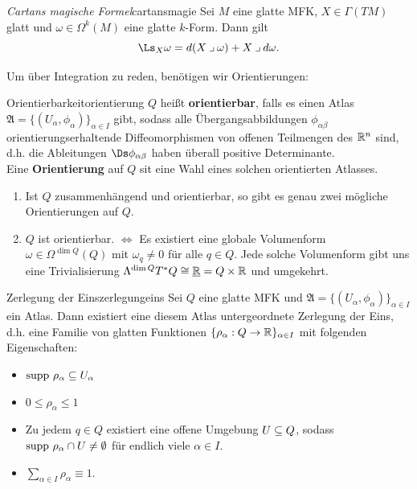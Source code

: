 \begin{theorem}{\textit{Cartans magische Formel}}{cartansmagie}
Sei $M$ eine glatte MFK, $X \in \Gamma(TM)$ glatt und $\omega \in \Omega^k(M)$ eine glatte $k$-Form. Dann gilt
\begin{equation}
\Ls_X \omega = d(X \iprod \omega) + X \iprod d\omega.
\end{equation}
\end{theorem}
Um über Integration zu reden, benötigen wir Orientierungen:
\begin{definition}{Orientierbarkeit}{orientierung}
$Q$ heißt \textbf{orientierbar}, falls es einen Atlas $\mathfrak{A} = \{ (U_\alpha, \phi_\alpha) \}_{\alpha \in I}$ gibt, sodass alle Übergangsabbildungen $\phi_{\alpha \beta}$ orientierungserhaltende Diffeomorphismen von offenen Teilmengen des $\mathbb{R}^n$ sind, d.h. die Ableitungen $\Ds \phi_{\alpha \beta}$ haben überall positive Determinante.\\
Eine \textbf{Orientierung} auf $Q$ sit eine Wahl eines solchen orientierten Atlasses.
\end{definition}
\begin{bemerkungen}
\begin{enumerate}
\item Ist $Q$ zusammenhängend und orientierbar, so gibt es genau zwei mögliche Orientierungen auf $Q$.
\item $Q$ ist orientierbar. $\iff$ Es existiert eine globale Volumenform $\omega \in \Omega^{\dim Q} (Q)$ mit $\omega_q \neq 0$ für alle $q \in Q$. Jede solche Volumenform gibt uns eine Trivialisierung $\Lambda^{\dim Q} T^\ast Q \cong \underline{\mathbb{R}} = Q \times \mathbb{R}$ und umgekehrt.
\end{enumerate}
\end{bemerkungen}
\begin{satz}{Zerlegung der Eins}{zerlegungeins}
Sei $Q$ eine glatte MFK und $\mathfrak{A} = \{ (U_\alpha, \phi_\alpha) \}_{\alpha \in I}$ ein Atlas. Dann existiert eine diesem Atlas untergeordnete Zerlegung der Eins, d.h. eine Familie von glatten Funktionen $\{ \rho_\alpha: Q \to \mathbb{R} \}_{\alpha \in I}$ mit folgenden Eigenschaften:
\begin{itemize}
\item $\supp \rho_\alpha \sub U_\alpha$
\item $0 \leq \rho_\alpha \leq 1$
\item Zu jedem $q \in Q$ existiert eine offene Umgebung $U \subseteq Q$, sodass $\supp \rho_\alpha \cap U \neq \emptyset$ für endlich viele $\alpha \in I$.
\item $\sum_{\alpha \in I} \rho_\alpha \equiv 1$.
\end{itemize}
\end{satz}
